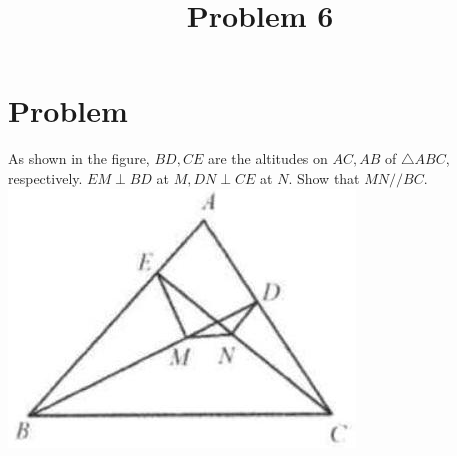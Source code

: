 \documentclass{article}
\title{Problem 6}
\date{}
\begin{document}
\maketitle

\section*{Problem}
As shown in the figure, \(B D, C E\) are the altitudes on \(A C, A B\) of \(\triangle A B C\), respectively. \(E M \perp B D\) at \(M, D N \perp C E\) at \(N\). Show that \(M N / / B C\).\\
\centering
\includegraphics[width=\textwidth]{images/problem_image_1.jpg}
\end{document}
